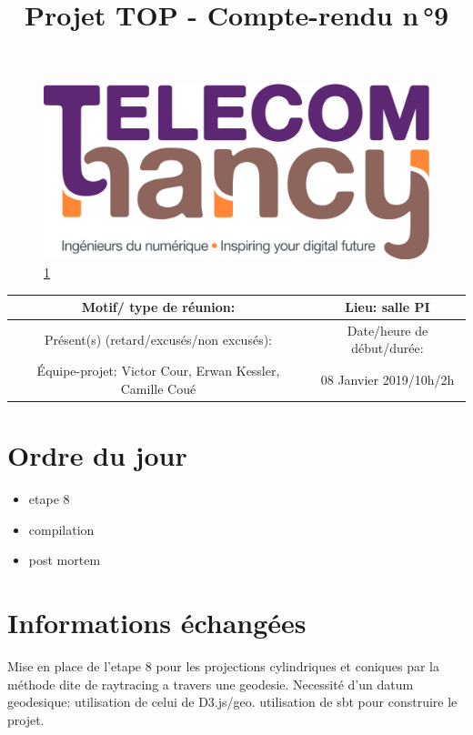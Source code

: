 \documentclass{article}
\date{}
\begin{document}
\begin{figure}
    \centering
    \includegraphics[scale=0.05]{logo_TNCY.png}
    \label{fig:logo_tncy}
    \ref{fig:logo_tncy}
\end{figure}
\title{Projet TOP - Compte-rendu n\,°9}
\maketitle
\vspace*{-1cm}

\begin{tabular}{|c|c|}
  \hline
  Motif/ type de réunion: & Lieu: salle PI \\
  \hline
	Présent(s) (retard/excusés/non excusés): 
	&  Date/heure de début/durée:\\
	Équipe-projet: Victor Cour, Erwan Kessler, Camille Coué
	& 08 Janvier 2019/10h/2h\\
  \hline
\end{tabular}


\section{Ordre du jour}

\begin{itemize}
  \item etape 8
  \item compilation
  \item post mortem
\end{itemize}

\section{Informations échangées}
 Mise en place de l'etape 8 pour les projections cylindriques et coniques par la méthode dite de raytracing a travers une geodesie. Necessité d'un datum geodesique: utilisation de celui de D3.js/geo. utilisation de sbt pour construire le projet.
\end{document}
